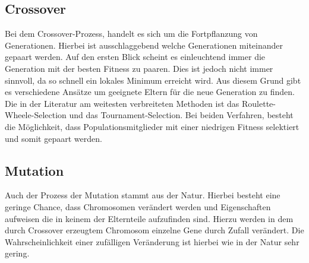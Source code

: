 \subsection{Crossover}
\label{chap:grundlagen_cossover}
Bei dem Crossover-Prozess, handelt es sich um die Fortpflanzung von Generationen. Hierbei ist ausschlaggebend welche Generationen miteinander gepaart werden. Auf den ersten Blick scheint es einleuchtend immer die Generation mit der besten Fitness zu paaren. Dies ist jedoch nicht immer sinnvoll, da so schnell ein lokales Minimum erreicht wird. Aus diesem Grund gibt es verschiedene Ansätze um geeignete Eltern für die neue Generation zu finden.\cite{davis1991handbook}
Die in der Literatur am weitesten verbreiteten Methoden ist das Roulette-Wheele-Selection und das Tournament-Selection.\cite{zhong2005comparison} Bei beiden Verfahren, besteht die Möglichkeit, dass Populationsmitglieder mit einer niedrigen Fitness selektiert und somit gepaart werden.

\subsection{Mutation}
Auch der Prozess der Mutation stammt aus der Natur. Hierbei besteht eine geringe Chance, dass Chromosomen verändert werden und Eigenschaften aufweisen die in keinem der Elternteile aufzufinden sind. Hierzu werden in dem durch Crossover erzeugtem Chromosom einzelne Gene durch Zufall verändert. Die Wahrscheinlichkeit einer zufälligen Veränderung ist hierbei wie in der Natur sehr gering.\cite{davis1991handbook}

